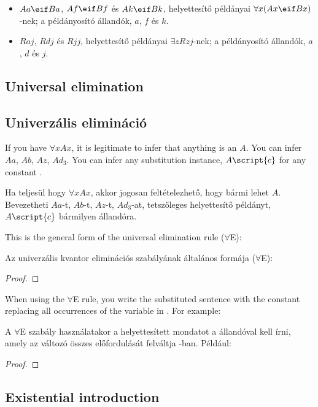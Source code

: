 \begin{itemize}
\item $Aa \eif Ba$, $Af \eif Bf$ és $Ak \eif Bk$, helyettesítő példányai $\forall x(Ax \eif Bx)$-nek; a példányosító állandók, $a$, $f$ és $k$.
\item $Raj$, $Rdj$ és $Rjj$, helyettesítő példányai $\exists zRzj$-nek; a példányosító állandók, $a$, $d$ és $j$.
\end{itemize}

\subsection*{Universal elimination}
\subsection{Univerzális elimináció}

If you have $\forall x Ax$, it is legitimate to infer that anything is an $A$. You can infer $Aa$, $Ab$, $Az$, $Ad_3$. You can infer any substitution instance, $A\script{c}$ for any constant .

Ha teljesül hogy $\forall x Ax$, akkor jogosan feltételezhető, hogy bármi lehet $A$. Bevezetheti $Aa$-t, $Ab$-t, $Az$-t, $Ad_3$-at, tetszőleges helyettesítő példányt, $A\script{c}$ bármilyen  állandóra.

This is the general form of the universal elimination rule ($\forall$E):

Az univerzális kvantor eliminációs szabályának általános formája ($\forall$E):

\begin{proof}
	 
\end{proof}

When using the $\forall$E rule, you write the substituted sentence with the constant  replacing all occurrences of the variable  in . For example:

A $\forall$E szabály használatakor a helyettesített mondatot a  állandóval kell írni, amely az   változó összes előfordulását felváltja -ban. Például:

\begin{proof}
	 
	 
\end{proof}


\subsection*{Existential introduction}

